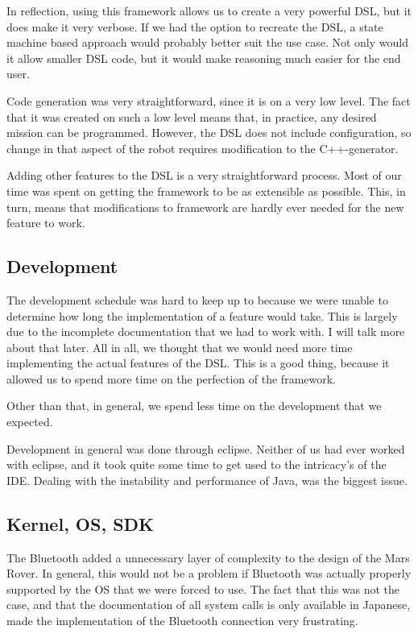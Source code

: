 \documentclass{scrartcl}
\begin{document}
In reflection, using this framework allows us to create a very powerful DSL, but it does make it very verbose.
If we had the option to recreate the DSL, a state machine based approach would probably better suit the use case.
Not only would it allow smaller DSL code, but it would make reasoning much easier for the end user.

Code generation was very straightforward, since it is on a very low level.
The fact that it was created on such a low level means that, in practice, any desired mission can be programmed.
However, the DSL does not include configuration, so change in that aspect of the robot requires modification to the C++-generator.

Adding other features to the DSL is a very straightforward process.
Most of our time was spent on getting the framework to be as extensible as possible.
This, in turn, means that modifications to framework are hardly ever needed for the new feature to work.

\subsection{Development}
The development schedule was hard to keep up to because we were unable to determine how long the implementation of a feature would take.
This is largely due to the incomplete documentation that we had to work with.
I will talk more about that later.
All in all, we thought that we would need more time implementing the actual features of the DSL.
This is a good thing, because it allowed us to spend more time on the perfection of the framework.

Other than that, in general, we spend less time on the development that we expected.

Development in general was done through eclipse.
Neither of us had ever worked with eclipse, and it took quite some time to get used to the intricacy's of the IDE.
Dealing with the instability and performance of Java, was the biggest issue.

\subsection{Kernel, OS, SDK}
The Bluetooth added a unnecessary layer of complexity to the design of the Mars Rover.
In general, this would not be a problem if Bluetooth was actually properly supported by the OS that we were forced to use.
The fact that this was not the case, and that the documentation of all system calls is only available in Japanese, made the implementation of the Bluetooth connection very frustrating.
\end{document}
